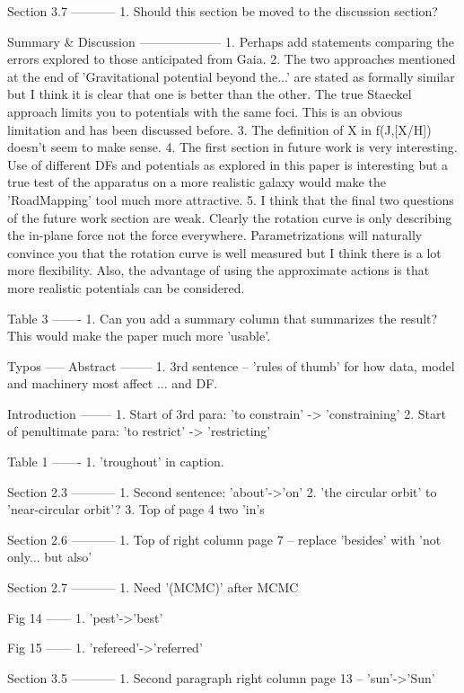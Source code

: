 \documentclass[10pt,a4paper]{article}
\begin{document}
Section 3.7
-----------
1. Should this section be moved to the discussion section?

Summary \& Discussion
--------------------
1. Perhaps add statements comparing the errors explored to those anticipated from Gaia.
2. The two approaches mentioned at the end of 'Gravitational potential beyond
the...' are stated as formally similar but I think it is clear that one is better
than the other. The true Staeckel approach limits you to potentials with the same
foci. This is an obvious limitation and has been discussed before.
3. The definition of X in f(J,[X/H]) doesn't seem to make sense.
4. The first section in future work is very interesting. Use of different DFs and
potentials as explored in this paper is interesting but a true test of the apparatus
on a more realistic galaxy would make the 'RoadMapping' tool much more attractive.
5. I think that the final two questions of the future work section are weak. Clearly
the rotation curve is only describing the in-plane force not the force everywhere.
Parametrizations will naturally convince you that the rotation curve is well
measured but I think there is a lot more flexibility. Also, the advantage of using
the approximate actions is that more realistic potentials can be considered.

Table 3
-------
1. Can you add a summary column that summarizes the result? This would make the
paper much more 'usable'.


Typos
-----
Abstract
--------
1. 3rd sentence -- 'rules of thumb' for how data, model and machinery most affect
... and DF.

Introduction
--------
1. Start of 3rd para: 'to constrain' -> 'constraining'
2. Start of penultimate para: 'to restrict' -> 'restricting'

Table 1
-------
1. 'troughout' in caption.

Section 2.3
-----------
1. Second sentence: 'about'->'on'
2. 'the circular orbit' to 'near-circular orbit'?
3. Top of page 4 two 'in's

Section 2.6
-----------
1. Top of right column page 7 -- replace 'besides' with 'not only... but also'

Section 2.7
-----------
1. Need '(MCMC)' after MCMC

Fig 14
------
1. 'pest'->'best'

Fig 15
------
1. 'refereed'->'referred'

Section 3.5
-----------
1. Second paragraph right column page 13 -- 'sun'->'Sun'
\end{document}
